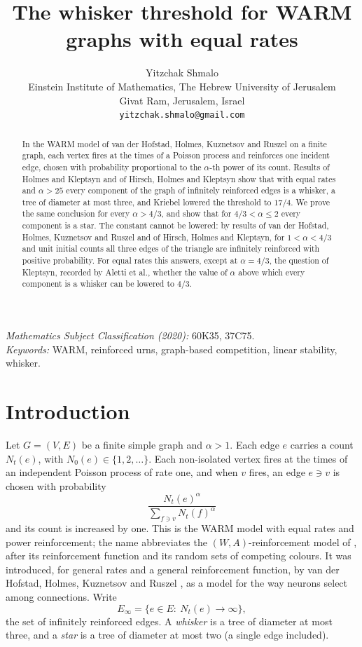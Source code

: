 \documentclass[11pt]{article}
\title{The whisker threshold for WARM graphs with equal rates}
\author{Yitzchak Shmalo\\
Einstein Institute of Mathematics, The Hebrew University of Jerusalem\\
Givat Ram, Jerusalem, Israel\\
\texttt{yitzchak.shmalo@gmail.com}}
\date{}
\theoremstyle{definition}
\theoremstyle{remark}
\begin{document}
\maketitle

\begin{abstract}
In the WARM model of van der Hofstad, Holmes, Kuznetsov and Ruszel on a finite graph, each vertex fires at the times of a Poisson process and reinforces one incident edge, chosen
with probability proportional to the $\alpha$-th power of its count. Results of Holmes and Kleptsyn and of Hirsch, Holmes and
Kleptsyn show that with equal rates and $\alpha>25$ every component of the graph of infinitely reinforced edges is a whisker, a tree of diameter at most three, and
Kriebel lowered the threshold to $17/4$. We prove the same conclusion for every $\alpha>4/3$, and show that for
$4/3<\alpha\le 2$ every component is a star. The constant cannot be lowered: by results of van der Hofstad, Holmes,
Kuznetsov and Ruszel and of Hirsch, Holmes and Kleptsyn, for $1<\alpha<4/3$ and unit initial counts all three edges
of the triangle are infinitely reinforced with positive probability. For equal rates this answers, except at
$\alpha=4/3$, the question of Kleptsyn, recorded by Aletti et al., whether the value of $\alpha$ above which every
component is a whisker can be lowered to
$4/3$.
\end{abstract}

\noindent\textit{Mathematics Subject Classification (2020):} 60K35, 37C75.\\
\textit{Keywords:} WARM, reinforced urns, graph-based competition, linear stability, whisker.

\section{Introduction}\label{sec:intro}

Let $G=(V,E)$ be a finite simple graph and $\alpha>1$. Each edge $e$ carries a count $N_t(e)$, with
$N_0(e)\in\{1,2,\dots\}$. Each non-isolated vertex fires at the times of an independent Poisson process of rate one, and when
$v$ fires, an edge $e\ni v$ is chosen with probability
\[
  \frac{N_t(e)^\alpha}{\sum_{f\ni v}N_t(f)^\alpha}
\]
and its count is increased by one. This is the WARM model with equal rates and power reinforcement; the name abbreviates the
$(W,A)$-reinforcement model of \cite{vdHHKR}, after its reinforcement function and its random sets of competing
colours. It was introduced, for general
rates and a general reinforcement function, by van der Hofstad, Holmes, Kuznetsov and Ruszel \cite{vdHHKR}, as a
model for the way neurons select among connections. Write
\[
  E_\infty=\{e\in E:\ N_t(e)\to\infty\},
\]
the set of infinitely reinforced edges.
A \emph{whisker} is a tree of diameter at most three, and a \emph{star} is a tree of diameter at most two (a single
edge included).
\end{document}
